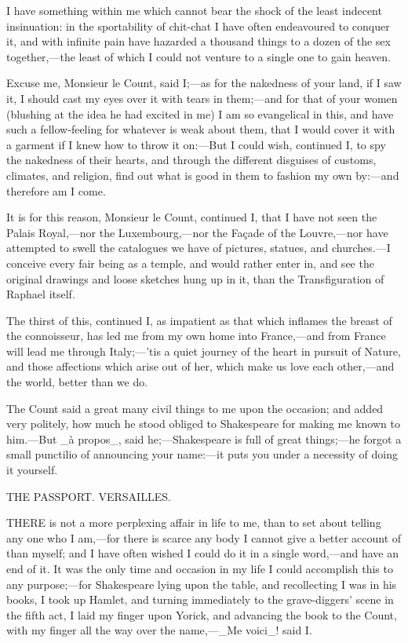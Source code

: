 \documentclass[twoside]{article}
\begin{document}
I have something within me which cannot bear the shock of the least
indecent insinuation: in the sportability of chit-chat I have often
endeavoured to conquer it, and with infinite pain have hazarded a
thousand things to a dozen of the sex together,—the least of which I
could not venture to a single one to gain heaven.

Excuse me, Monsieur le Count, said I;—as for the nakedness of your land,
if I saw it, I should cast my eyes over it with tears in them;—and for
that of your women (blushing at the idea he had excited in me) I am so
evangelical in this, and have such a fellow-feeling for whatever is weak
about them, that I would cover it with a garment if I knew how to throw
it on:—But I could wish, continued I, to spy the nakedness of their
hearts, and through the different disguises of customs, climates, and
religion, find out what is good in them to fashion my own by:—and
therefore am I come.

It is for this reason, Monsieur le Count, continued I, that I have not
seen the Palais Royal,—nor the Luxembourg,—nor the Façade of the
Louvre,—nor have attempted to swell the catalogues we have of pictures,
statues, and churches.—I conceive every fair being as a temple, and would
rather enter in, and see the original drawings and loose sketches hung up
in it, than the Transfiguration of Raphael itself.

The thirst of this, continued I, as impatient as that which inflames the
breast of the connoisseur, has led me from my own home into France,—and
from France will lead me through Italy;—’tis a quiet journey of the heart
in pursuit of Nature, and those affections which arise out of her, which
make us love each other,—and the world, better than we do.

The Count said a great many civil things to me upon the occasion; and
added very politely, how much he stood obliged to Shakespeare for making
me known to him.—But _à propos_, said he;—Shakespeare is full of great
things;—he forgot a small punctilio of announcing your name:—it puts you
under a necessity of doing it yourself.




THE PASSPORT.
VERSAILLES.


THERE is not a more perplexing affair in life to me, than to set about
telling any one who I am,—for there is scarce any body I cannot give a
better account of than myself; and I have often wished I could do it in a
single word,—and have an end of it.  It was the only time and occasion in
my life I could accomplish this to any purpose;—for Shakespeare lying
upon the table, and recollecting I was in his books, I took up Hamlet,
and turning immediately to the grave-diggers’ scene in the fifth act, I
laid my finger upon Yorick, and advancing the book to the Count, with my
finger all the way over the name,—_Me voici_! said I.
\end{document}
